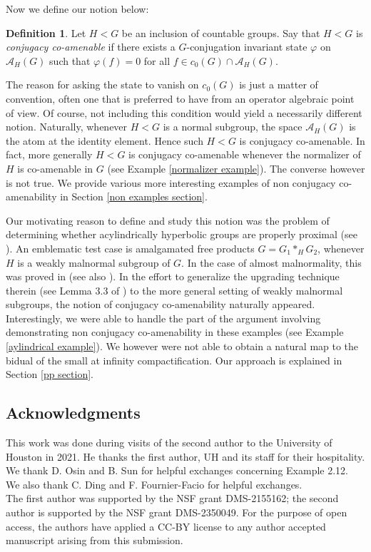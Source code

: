 \documentclass[11pt]{amsart}
\theoremstyle{definition}
\newtheorem{defn}[thm]{Definition}
\begin{document}
Now we define our notion below: 

\begin{defn}\label{Defn 1}
Let $H<G$ be an inclusion of countable groups. Say that $H<G$ is \emph{conjugacy co-amenable} if there exists a $G$-conjugation invariant state $\varphi$ on $\mathcal{A}_H(G)$ such that $\varphi(f)=0$ for all $f\in c_0(G)\cap \mathcal{A}_H(G)$. 
\end{defn}

The reason for asking the state to vanish on $c_0(G)$ is just a matter of convention, often one that is preferred to have from an operator algebraic point of view. Of course, not including this condition would yield a necessarily different notion. Naturally, whenever $H<G$ is a normal subgroup, the space $\mathcal{A}_H(G)$ is the atom at the identity element. Hence such $H<G$ is conjugacy co-amenable. In fact, more generally $H<G$ is conjugacy co-amenable whenever the normalizer of $H$ is co-amenable in $G$ (see Example \ref{normalizer example}). The converse however is not true. We provide various more interesting examples of non conjugacy co-amenability in Section \ref{non examples section}. 

Our motivating reason to define and study this notion was the problem of determining whether acylindrically hyperbolic groups are properly proximal (see \cite{BIP18, DKEP21}). An emblematic test case is amalgamated free products $G= G_1*_HG_2$, whenever $H$ is a weakly malnormal subgroup of $G$. In the case of almost malnormality, this was proved in \cite{DKE21} (see also \cite{DKE24}). In the effort to generalize the upgrading technique therein (see Lemma 3.3 of \cite{DKE21}) to the more general setting of weakly malnormal subgroups, the notion of conjugacy co-amenability naturally appeared. Interestingly, we were able to handle the part of the argument involving demonstrating non conjugacy co-amenability in these examples (see Example \ref{aylindrical example}). We however were not able to obtain a natural map to the bidual of the small at infinity compactification. Our approach is explained in Section \ref{pp section}. 


\subsection*{Acknowledgments} This work was done during visits of the second author to the University of Houston in 2021. He thanks the first author, UH and its staff for their hospitality. We thank D. Osin and B. Sun for helpful exchanges concerning Example 2.12. We also thank C. Ding and F. Fournier-Facio for helpful exchanges. 
\\
The first author was supported by the NSF grant DMS-2155162; the second author is supported by the NSF grant DMS-2350049.
For the purpose of open access, the authors have applied a CC-BY license to any author accepted manuscript arising from this submission.
\end{document}
